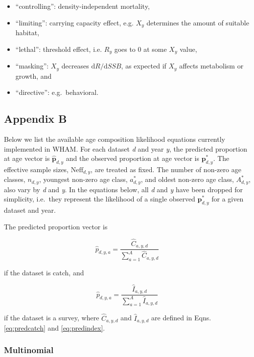\documentclass[]{article}
\providecommand{\tightlist}{%
  \setlength{\itemsep}{0pt}\setlength{\parskip}{0pt}}
\begin{document}
\begin{itemize}
\tightlist
\item
  ``controlling'': density-independent mortality,
\item
  ``limiting'': carrying capacity effect, e.g. \(X_y\) determines the
  amount of suitable habitat,
\item
  ``lethal'': threshold effect, i.e. \(R_y\) goes to 0 at some \(X_y\)
  value,
\item
  ``masking'': \(X_y\) decreases \(\text{d}R/\text{d}SSB\), as expected
  if \(X_y\) affects metabolism or growth, and
\item
  ``directive'': e.g.~behavioral.
\end{itemize}

\pagebreak

\hypertarget{appendix-b}{%
\subsection*{Appendix B}\label{appendix-b}}

Below we list the available age composition likelihood equations
currently implemented in WHAM. For each dataset \emph{d} and year
\emph{y}, the predicted proportion at age vector is
\(\hat{\mathbf{p}}_{d,y}\) and the observed proportion at age vector is
\(\mathbf{p}^*_{d,y}\). The effective sample sizes,
\(\mathrm{Neff}_{d,y}\), are treated as fixed. The number of non-zero
age classes, \(n_{d,y}\), youngest non-zero age class, \(a^{*}_{d,y}\),
and oldest non-zero age class, \(A^{*}_{d,y}\), also vary by \emph{d}
and \emph{y}. In the equations below, all \emph{d} and \emph{y} have
been dropped for simplicity, i.e.~they represent the likelihood of a
single observed \(\mathbf{p}^*_{d,y}\) for a given dataset and year.

The predicted proportion vector is

\[\hat{p}_{d,y,a} = \frac{\hat{C}_{a,y,d}}{\sum_{a=1}^{A} \hat{C}_{a,y,d}}\]

if the dataset is catch, and

\[\hat{p}_{d,y,a} = \frac{\hat{I}_{a,y,d}}{\sum_{a=1}^{A} \hat{I}_{a,y,d}}\]

if the dataset is a survey, where \(\hat{C}_{a,y,d}\) and
\(\hat{I}_{a,y,d}\) are defined in Eqns. \ref{eq:predcatch} and
\ref{eq:predindex}.

\hypertarget{multinomial}{%
\subsubsection*{Multinomial}\label{multinomial}}
\end{document}
